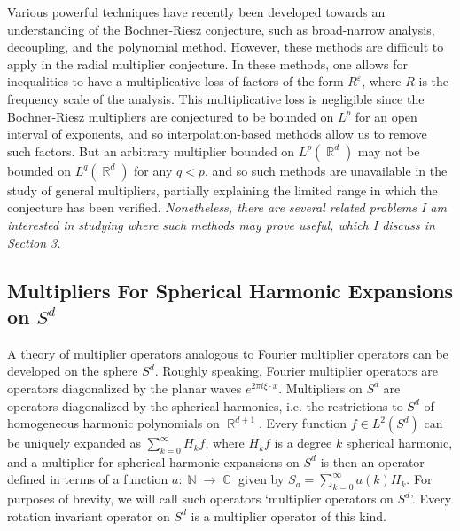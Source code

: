 \documentclass[11pt]{article}
\DeclareMathOperator{\RR}{\mathbb{R}}
\DeclareMathOperator{\NN}{\mathbb{N}}
\DeclareMathOperator{\CC}{\mathbb{C}}
\begin{document}
Various powerful techniques have recently been developed towards an understanding of the Bochner-Riesz conjecture, such as broad-narrow analysis, decoupling, and the polynomial method. However, these methods are difficult to apply in the radial multiplier conjecture. In these methods, one allows for inequalities to have a multiplicative loss of factors of the form $R^\varepsilon$, where $R$ is the frequency scale of the analysis. This multiplicative loss is negligible since the Bochner-Riesz multipliers are conjectured to be bounded on $L^p$ for an open interval of exponents, and so interpolation-based methods allow us to remove such factors.
But an arbitrary multiplier bounded on $L^p(\RR^d)$ may not be bounded on $L^q(\RR^d)$ for any $q < p$, and so such methods are unavailable in the study of general multipliers, partially explaining the limited range in which the conjecture has been verified. \emph{Nonetheless, there are several related problems I am interested in studying where such methods may prove useful, which I discuss in Section 3.}

\subsection{Multipliers For Spherical Harmonic Expansions on $S^d$}

A theory of multiplier operators analogous to Fourier multiplier operators can be developed on the sphere $S^d$. Roughly speaking, Fourier multiplier operators are operators diagonalized by the planar waves $e^{2 \pi i \xi \cdot x}$. Multipliers on $S^d$ are operators diagonalized by the spherical harmonics, i.e. the restrictions to $S^d$ of homogeneous harmonic polynomials on $\RR^{d+1}$. Every function $f \in L^2(S^d)$ can be uniquely expanded as $\sum_{k = 0}^\infty H_k f$, where $H_k f$ is a degree $k$ spherical harmonic, and a multiplier for spherical harmonic expansions on $S^d$ is then an operator defined in terms of a function $a: \NN \to \CC$ given by $S_a = \sum_{k = 0}^\infty a(k) H_k$.
%
%
For purposes of brevity, we will call such operators `multiplier operators on $S^d$'. Every rotation invariant operator on $S^d$ is a multiplier operator of this kind. %
\end{document}

